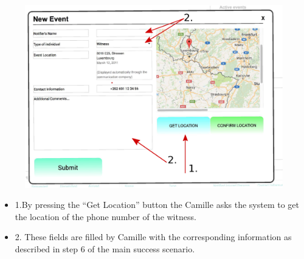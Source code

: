 \begin{minipage}{0.72\textwidth}
\begin{figure}[H]
\includegraphics[width=1.0\textwidth]{GetLocation.eps}
\end{figure}
\end{minipage} \hfill
\begin{minipage}{0.23\textwidth}
\begin{itemize}
\item 1.By pressing the ``Get Location'' button the Camille asks the system to
get the location of the phone number of the witness.
\item 2. These fields are filled by Camille with the corresponding
information as described in step 6 of the main success scenario.
\end{itemize}
\end{minipage}

